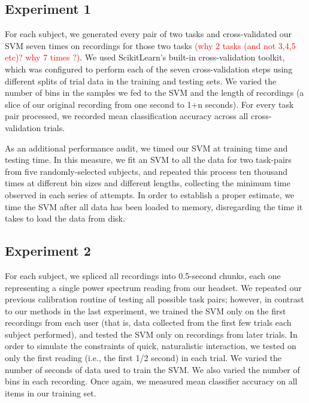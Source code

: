 
\subsection{Experiment 1}

For each subject, we generated every pair of two tasks and cross-validated our SVM seven times on recordings for those two tasks \textcolor{red}{(why 2 tasks (and not 3,4,5 etc)? why 7 times ?)}. We used ScikitLearn's built-in cross-validation toolkit, which was configured to perform each of the seven cross-validation steps using different splits of trial data in the training and testing sets. We varied the number of bins in the samples we fed to the SVM and the length of recordings (a slice of our original recording from one second to 1+n seconds). For every task pair processed, we recorded mean classification accuracy across all cross-validation trials.

As an additional performance audit, we timed our SVM at training time and testing time. In this measure, we fit an SVM to all the data for two task-pairs from five randomly-selected subjects, and repeated this process ten thousand times at different bin sizes and different lengths, collecting the minimum time observed in each series of attempts. In order to establish a proper estimate, we time the SVM after all data has been loaded to memory, disregarding the time it takes to load the data from disk.

\subsection{Experiment 2}

For each subject, we spliced all recordings into 0.5-second chunks, each one representing a single power spectrum reading from our headset. We repeated our previous calibration routine of testing all possible task pairs; however, in contrast to our methods in the last experiment, we trained the SVM only on the first recordings from each user (that is, data collected from the first few trials each subject performed), and tested the SVM only on recordings from later trials. In order to simulate the constraints of quick, naturalistic interaction, we tested on only the first reading (i.e., the first 1/2 second) in each trial. We varied the number of seconds of data used to train the SVM. We also varied the number of bins in each recording. Once again, we measured mean classifier accuracy on all items in our training set.
